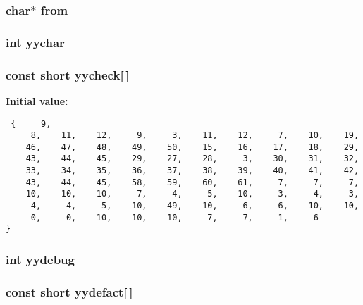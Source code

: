 \subsubsection{\setlength{\rightskip}{0pt plus 5cm}char$\ast$ from}\label{vcd__parser_8c_a101}


\subsubsection{\setlength{\rightskip}{0pt plus 5cm}int yychar}\label{vcd__parser_8c_a96}


\subsubsection{\setlength{\rightskip}{0pt plus 5cm}const short yycheck[$\,$]\hspace{0.3cm}{\tt  [static]}}\label{vcd__parser_8c_a95}


{\bf Initial value:}

\footnotesize\begin{verbatim} {     9,
     8,    11,    12,     9,     3,    11,    12,     7,    10,    19,
    46,    47,    48,    49,    50,    15,    16,    17,    18,    29,
    43,    44,    45,    29,    27,    28,     3,    30,    31,    32,
    33,    34,    35,    36,    37,    38,    39,    40,    41,    42,
    43,    44,    45,    58,    59,    60,    61,     7,     7,     7,
    10,    10,    10,     7,     4,     5,    10,     3,     4,     3,
     4,     4,     5,    10,    49,    10,     6,     6,    10,    10,
     0,     0,    10,    10,    10,     7,     7,    -1,     6
}\end{verbatim}\normalsize 
{}
\subsubsection{\setlength{\rightskip}{0pt plus 5cm}int yydebug}\label{vcd__parser_8c_a100}


\subsubsection{\setlength{\rightskip}{0pt plus 5cm}const short yydefact[$\,$]\hspace{0.3cm}{\tt  [static]}}\label{vcd__parser_8c_a90}


